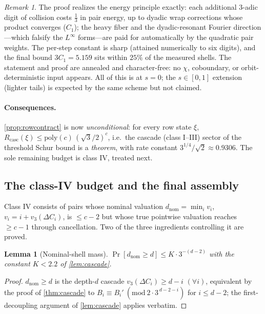 \documentclass[11pt]{article}
\theoremstyle{plain}
\newtheorem{lemma}{Lemma}
\theoremstyle{definition}
\theoremstyle{remark}
\newtheorem*{remark}{Remark}
\begin{document}
\begin{remark}
The proof realizes the energy principle exactly: each additional $3$-adic
digit of collision costs $\tfrac13$ in pair energy, up to dyadic wrap
corrections whose product converges ($C_1$); the heavy fiber and the
dyadic-resonant Fourier direction---which falsify the $L^\infty$
forms---are paid for automatically by the quadratic pair weights. The
per-step constant is sharp (attained numerically to six digits), and the
final bound $3C_1=5.159$ sits within $25\%$ of the measured shells. The
statement and proof are annealed and character-free: no $\chi$,
coboundary, or orbit-deterministic input appears. All of this is at
$s=0$; the $s\in[0,1]$ extension (lighter tails) is expected by the same
scheme but not claimed.
\end{remark}

\paragraph{Consequences.} \cref{prop:rowcontract} is now
\emph{unconditional}: for every row state $\xi$,
$R_{\mathrm{casc}}(\xi)\le\mathrm{poly}(c)\,(\sqrt3/2)^c$, i.e.\ the
cascade (class I--III) sector of the threshold Schur bound is a
\emph{theorem}, with rate constant $3^{1/4}/\sqrt2\approx0.9306$. The
sole remaining budget is class IV, treated next.

\subsection*{The class-IV budget and the final assembly}

Class IV consists of pairs whose nominal valuation
$d_{\mathrm{nom}}=\min_i v_i$, $v_i=i+v_3(\Delta C_i)$, is $\le c-2$ but
whose true pointwise valuation reaches $\ge c-1$ through cancellation.
Two of the three ingredients controlling it are proved.

\begin{lemma}[Nominal-shell mass]\label{lem:nomshell}
$\Pr[d_{\mathrm{nom}}\ge d]\le K\cdot3^{-(d-2)}$ with the constant
$K<2.2$ of \cref{lem:cascade}.
\end{lemma}
\begin{proof}
$d_{\mathrm{nom}}\ge d$ is the depth-$d$ cascade
$v_3(\Delta C_i)\ge d-i$ $(\forall i)$, equivalent by the proof of
\cref{thm:cascade} to $B_i\equiv B_i'\ (\mathrm{mod}\ 2\cdot3^{\,d-2-i})$
for $i\le d-2$; the first-decoupling argument of \cref{lem:cascade}
applies verbatim.
\end{proof}
\end{document}
